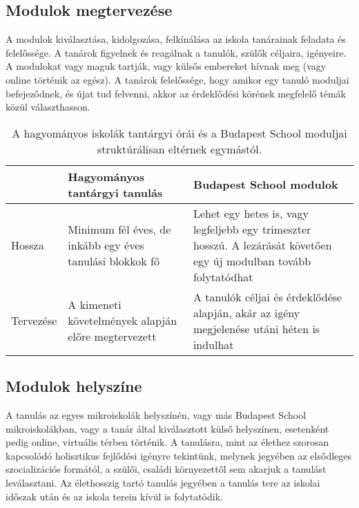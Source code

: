 \subsection{ Modulok megtervezése}

A modulok kiválasztása, kidolgozása, felkínálása az iskola tanárainak feladata és felelőssége. A tanárok figyelnek és reagálnak a tanulók, szülők céljaira, igényeire. A modulokat vagy maguk tartják, vagy külsős embereket hívnak meg (vagy online történik az egész). A tanárok felelőssége, hogy amikor egy tanuló moduljai befejeződnek, és újat tud felvenni, akkor az érdeklődési körének megfelelő témák közül választhasson.


\begin{table}[h]
\centering
\begin{tabular}{@{}p{1.5cm}|p{4cm}|p{4cm}@{}}

& \textbf{Hagyományos tantárgyi tanulás}  & \textbf{ Budapest School modulok}
\\ \hline
   Hossza &
   Minimum fél éves, de inkább egy éves tanulási blokkok fő &
   Lehet egy hetes is, vagy legfeljebb egy trimeszter hosszú. A lezárását követően egy új modulban tovább folytatódhat \\ \hline
Tervezése & A kimeneti követelmények alapján előre megtervezett &
 A tanulók céljai és érdeklődése alapján, akár az igény megjelenése utáni héten is indulhat\\ \hline

\end{tabular}
\caption{A hagyományos iskolák tantárgyi órái és a Budapest School moduljai struktúrálisan eltérnek egymástól.}

\label{tanorak-vs-modulok}

\end{table}



\subsection{ Modulok helyszíne}




A tanulás az egyes mikroiskolák helyszínén, vagy más Budapest School mikroiskolákban, vagy a tanár által kiválasztott külső helyszínen, esetenként pedig online, virtuális térben történik. A tanulásra, mint az élethez szorosan kapcsolódó holisztikus fejlődési igényre tekintünk, melynek jegyében az elsődleges szocializációs formától, a szülői, családi környezettől sem akarjuk a tanulást leválasztani. Az élethosszig tartó tanulás jegyében a tanulás tere az iskolai időszak után és az iskola terein kívül is folytatódik.

